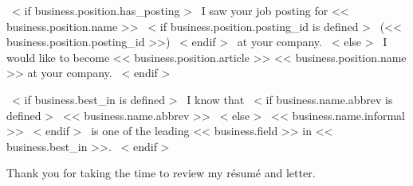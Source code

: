 ~< if business.position.has_posting >~
    I saw your job posting for << business.position.name >>
    ~< if business.position.posting_id is defined >~ (<< business.position.posting_id >>) ~< endif >~ at your company.
~< else >~
    I would like to become << business.position.article >> << business.position.name >> at your company.
~< endif >~

~< if business.best_in is defined >~
    I know that
    ~< if business.name.abbrev is defined >~
        << business.name.abbrev >>
    ~< else >~
        << business.name.informal >>
    ~< endif >~
    is one of the leading << business.field >> in << business.best_in >>.
~< endif >~



Thank you for taking the time to review my résumé and letter.
